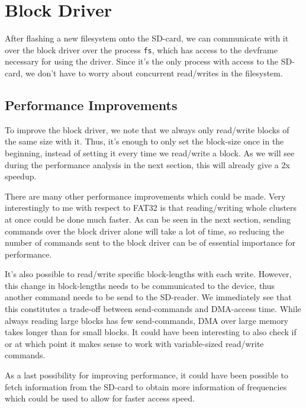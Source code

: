 \section{Block Driver}
After flashing a new filesystem onto the SD-card, we can communicate with it over 
the block driver over the process \texttt{fs}, which has access to the devframe necessary
for using the driver. Since it's the only process with access to the SD-card, we don't have to worry 
about concurrent read/writes in the filesystem.

\subsection{Performance Improvements}
To improve the block driver, we note that we always only read/write blocks of the 
same size with it. Thus, it's enough to only set the block-size once in the beginning,
instead of setting it every time we read/write a block. As we will see during the 
performance analysis in the next section, this will already give a 2x speedup.

There are many other performance improvements which could be made.
Very interestingly to me with respect to FAT32 is that reading/writing whole 
clusters at once could be done much faster. As can be seen in the next section,
sending commands over the block driver alone will take a lot of time, 
so reducing the number of commands sent to the block driver can be of essential 
importance for performance.

It's also possible to read/write specific block-lengths with each write.
However, this change in block-lengths needs to be communicated to the device,
thus another command needs to be send to the SD-reader. We immediately see 
that this constitutes a trade-off between send-commands and DMA-access time.
While always reading large blocks has few send-commands, DMA over large memory 
takes longer than for small blocks. It could have been interesting to also 
check if or at which point it makes sense to work with variable-sized read/write 
commands.

As a last possibility for improving performance, it could have been possible 
to fetch information from the SD-card to obtain more information of frequencies 
which could be used to allow for faster access speed.

